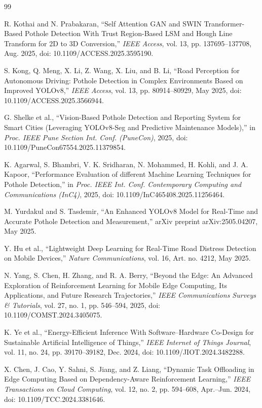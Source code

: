 \documentclass{ieeeaccess}
\begin{document}
\begin{thebibliography}{99}

R. Kothai and N. Prabakaran, ``Self Attention GAN and SWIN Transformer-Based Pothole Detection With Trust Region-Based LSM and Hough Line Transform for 2D to 3D Conversion,'' \textit{IEEE Access}, vol. 13, pp. 137695--137708, Aug. 2025, doi: 10.1109/ACCESS.2025.3595190.

S. Kong, Q. Meng, X. Li, Z. Wang, X. Liu, and B. Li, ``Road Perception for Autonomous Driving: Pothole Detection in Complex Environments Based on Improved YOLOv8,'' \textit{IEEE Access}, vol. 13, pp. 80914--80929, May 2025, doi: 10.1109/ACCESS.2025.3566944.

G. Shelke et al., ``Vision-Based Pothole Detection and Reporting System for Smart Cities (Leveraging YOLOv8-Seg and Predictive Maintenance Models),'' in \textit{Proc. IEEE Pune Section Int. Conf. (PuneCon)}, 2025, doi: 10.1109/PuneCon67554.2025.11379854.

K. Agarwal, S. Bhambri, V. K. Sridharan, N. Mohammed, H. Kohli, and J. A. Kapoor, ``Performance Evaluation of different Machine Learning Techniques for Pothole Detection,'' in \textit{Proc. IEEE Int. Conf. Contemporary Computing and Communications (InC4)}, 2025, doi: 10.1109/InC465408.2025.11256464.

M. Yurdakul and S. Tasdemir, ``An Enhanced YOLOv8 Model for Real-Time and Accurate Pothole Detection and Measurement,'' arXiv preprint arXiv:2505.04207, May 2025.

Y. Hu et al., ``Lightweight Deep Learning for Real-Time Road Distress Detection on Mobile Devices,'' \textit{Nature Communications}, vol. 16, Art. no. 4212, May 2025.

N. Yang, S. Chen, H. Zhang, and R. A. Berry, ``Beyond the Edge: An Advanced Exploration of Reinforcement Learning for Mobile Edge Computing, Its Applications, and Future Research Trajectories,'' \textit{IEEE Communications Surveys \& Tutorials}, vol. 27, no. 1, pp. 546--594, 2025, doi: 10.1109/COMST.2024.3405075.

K. Ye et al., ``Energy-Efficient Inference With Software--Hardware Co-Design for Sustainable Artificial Intelligence of Things,'' \textit{IEEE Internet of Things Journal}, vol. 11, no. 24, pp. 39170--39182, Dec. 2024, doi: 10.1109/JIOT.2024.3482288.

X. Chen, J. Cao, Y. Sahni, S. Jiang, and Z. Liang, ``Dynamic Task Offloading in Edge Computing Based on Dependency-Aware Reinforcement Learning,'' \textit{IEEE Transactions on Cloud Computing}, vol. 12, no. 2, pp. 594--608, Apr.--Jun. 2024, doi: 10.1109/TCC.2024.3381646.


\end{thebibliography}
\end{document}
